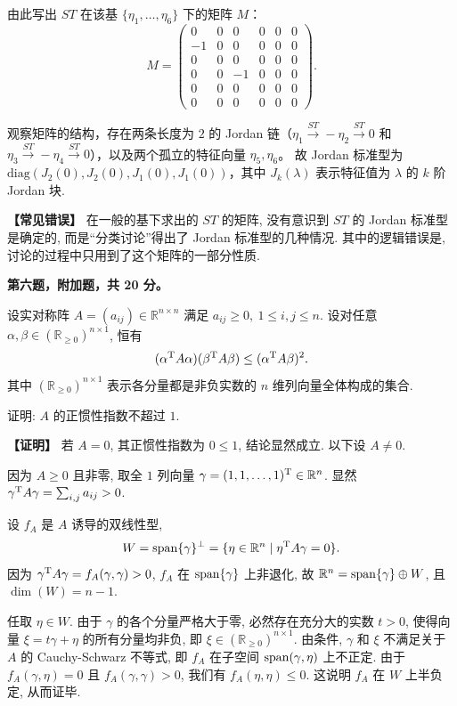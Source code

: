 \begin{enumerate}
由此写出 $ST$ 在该基 $\{\eta_1,\dots,\eta_6\}$ 下的矩阵 $M$：
\[M=
\begin{pmatrix}
0&0&0&0&0&0\\
-1&0&0&0&0&0\\
0&0&0&0&0&0\\
0&0&-1&0&0&0\\
0&0&0&0&0&0\\
0&0&0&0&0&0
\end{pmatrix}.\]

观察矩阵的结构，存在两条长度为 $2$ 的 Jordan 链（$\eta_1\xrightarrow{ST}-\eta_2\xrightarrow{ST}0$ 和 $\eta_3\xrightarrow{ST}-\eta_4\xrightarrow{ST}0$），以及两个孤立的特征向量 $\eta_5,\eta_6$。
故 Jordan 标准型为 $\mathrm{diag}(J_2(0),J_2(0),J_1(0),J_1(0))$，其中 $J_k(\lambda)$ 表示特征值为 $\lambda$ 的 $k$ 阶 Jordan 块.

\textbf{【常见错误】} 在一般的基下求出的 $ST$ 的矩阵, 
没有意识到 $ST$ 的 Jordan 标准型是确定的, 而是“分类讨论”得出了 Jordan 标准型的几种情况. 
其中的逻辑错误是, 讨论的过程中只用到了这个矩阵的一部分性质.
\end{enumerate}

\textbf{第六题，附加题，共 20 分。}

设实对称阵 $A=(a_{ij})\in\mathbb{R}^{n\times n}$ 满足 $a_{ij}\ge0,\ 1\le i,j\le n$. 
设对任意 $\alpha,\beta\in(\mathbb{R}_{\ge0})^{n\times1}$, 恒有
\[(\alpha^{\rm T}A\alpha)(\beta^{\rm T}A\beta)\le(\alpha^{\rm T}A\beta)^2.\]
其中 $(\mathbb{R}_{\ge0})^{n\times1}$ 表示各分量都是非负实数的 $n$ 维列向量全体构成的集合.

证明: $A$ 的正惯性指数不超过 $1$.

\textbf{【证明】} 若 $A=0$, 其正惯性指数为 $0\le1$, 结论显然成立. 以下设 $A\neq0$.

因为 $A\ge0$ 且非零, 取全 $1$ 列向量 $\gamma=(1,1,\dots,1)^{\rm T}\in\mathbb{R}^n$. 
显然 $\gamma^{\rm T}A\gamma=\sum_{i,j}a_{ij}>0$.

设 $f_A$ 是 $A$ 诱导的双线性型,
\[W=\operatorname{span}\{\gamma\}^\perp=\{\eta\in\mathbb{R}^n\mid \eta^{\rm T}A\gamma=0\}.\]
因为 $\gamma^{\rm T}A\gamma=f_A(\gamma,\gamma)>0$, 
$f_A$ 在 $\operatorname{span}\{\gamma\}$ 上非退化, 
故 $\mathbb{R}^n=\operatorname{span}\{\gamma\}\oplus W$, 且 $\dim(W)=n-1$.

任取 $\eta\in W$. 由于 $\gamma$ 的各个分量严格大于零, 
必然存在充分大的实数 $t>0$, 使得向量 $\xi=t\gamma+\eta$ 的所有分量均非负, 
即 $\xi\in(\mathbb{R}_{\ge0})^{n\times1}$. 
由条件, $\gamma$ 和 $\xi$ 不满足关于 $A$ 的 Cauchy-Schwarz 不等式, 
即 $f_A$ 在子空间 $\operatorname{span}(\gamma,\eta)$ 上不正定. 
由于 $f_A(\gamma,\eta)=0$ 且 $f_A(\gamma,\gamma)>0$, 
我们有 $f_A(\eta,\eta)\le0$. 这说明 $f_A$ 在 $W$ 上半负定, 从而证毕.

